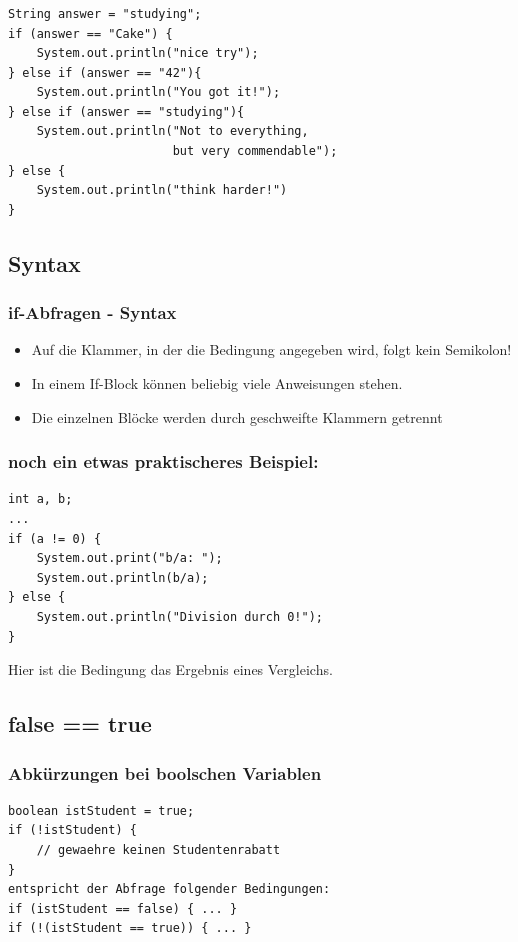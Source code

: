 \documentclass[final]{beamer}
\begin{document}
\begin{frame}[containsverbatim]
	\frametitle{}
	\begin{lstlisting}
String answer = "studying";
if (answer == "Cake") {
	System.out.println("nice try");
} else if (answer == "42"){
	System.out.println("You got it!");
} else if (answer == "studying"){
	System.out.println("Not to everything,
                       but very commendable");
} else {
	System.out.println("think harder!")
}
	\end{lstlisting}
\end{frame}

\subsection{Syntax}
\begin{frame}
	\frametitle{if-Abfragen - Syntax}
	\begin{itemize}
		\item{Auf die Klammer, in der die Bedingung angegeben wird, folgt kein Semikolon!}
		\item{In einem If-Block können beliebig viele Anweisungen stehen.}
		\item{Die einzelnen Blöcke werden durch geschweifte Klammern getrennt}
	\end{itemize}
\end{frame}

\begin{frame}[containsverbatim]
	\frametitle{noch ein etwas praktischeres Beispiel:}
	\begin{lstlisting}
int a, b;
...
if (a != 0) {
	System.out.print("b/a: ");
	System.out.println(b/a);
} else {
	System.out.println("Division durch 0!");
}
	\end{lstlisting}	
	Hier ist die Bedingung das Ergebnis eines Vergleichs.	
\end{frame}

\subsection{false == true}
\begin{frame}[containsverbatim]
	\frametitle{Abkürzungen bei boolschen Variablen}
	\begin{lstlisting}
boolean istStudent = true;
if (!istStudent) {
	// gewaehre keinen Studentenrabatt
}
entspricht der Abfrage folgender Bedingungen:
if (istStudent == false) { ... }
if (!(istStudent == true)) { ... }

	\end{lstlisting}
\end{frame}
\end{document}
